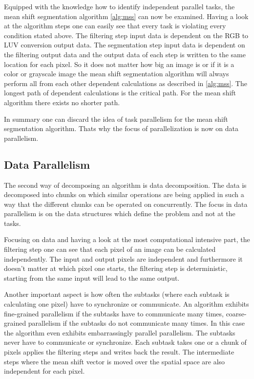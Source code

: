 Equipped with the knowledge how to identify independent parallel tasks, the 
mean shift segmentation algorithm \autoref{alg:mss} can now be examined. 
Having a look at the algorithm steps one can easily see that every task is 
violating every condition stated above. The filtering step input data is 
dependent on the \gls{RGB} to \gls{LUV} conversion output data. The segmentation
step input data is dependent on the filtering output data and the output data 
of each step is written to the same location for each pixel. So it does not matter
how big an image is or if it is a color or grayscale image the mean shift segmentation
algorithm will always perform all from each other dependent calculations as
described in \autoref{alg:mss}. The longest path of dependent calculations
is the critical path. For the mean shift algorithm there exists no shorter path. 

In summary one can discard the idea of task parallelism for the mean shift
segmentation algorithm. Thats why the focus of parallelization is now on data
parallelism.


\subsection{Data Parallelism} %
\label{sub:data_parallelism}
The second way of decomposing an algorithm is data decomposition. The data is
decomposed into chunks on which similar operations are being applied in such a
way that the different chunks can be operated on concurrently. The focus in data
parallelism is on the data structures which define the problem and not at the
tasks.

Focusing on data and having a look at the most computational intensive part, 
the filtering step one can see that each pixel of an image can be calculated 
independently. The input and output pixels are independent and furthermore it
doesn't matter at which pixel one starts, the filtering step is deterministic, 
starting from the same input will lead to the same output. 

Another important aspect is how often the subtasks (where each subtask is
calculating one pixel) have to synchronize or communicate. An algorithm exhibits
fine-grained parallelism if the subtasks have to communicate many times,
coarse-grained parallelism if the subtasks do not communicate many times. In
this case the algorithm even exhibits embarrassingly parallel parallelism. The
subtasks never have to communicate or synchronize. Each subtask takes one or a
chunk of pixels applies the filtering steps and writes back the result. The
intermediate steps where the mean shift vector is moved over the spatial space
are also independent for each pixel. 

